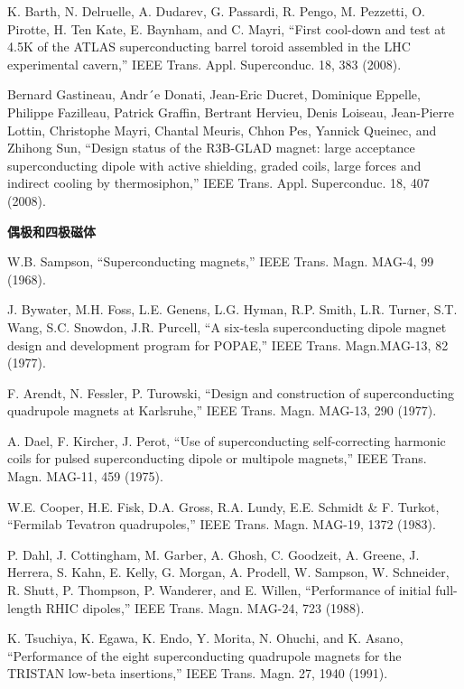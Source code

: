 \noindent [9.300] K. Barth, N. Delruelle, A. Dudarev, G. Passardi, R. Pengo, M. Pezzetti, O. Pirotte,
H. Ten Kate, E. Baynham, and C. Mayri, ``First cool-down and test at 4.5K
of the ATLAS superconducting barrel toroid assembled in the LHC experimental
cavern,” IEEE Trans. Appl. Superconduc. 18, 383 (2008).

\noindent [9.301] Bernard Gastineau, Andr´e Donati, Jean-Eric Ducret, Dominique Eppelle, Philippe
Fazilleau, Patrick Graffin, Bertrant Hervieu, Denis Loiseau, Jean-Pierre Lottin,
Christophe Mayri, Chantal Meuris, Chhon Pes, Yannick Queinec, and Zhihong
Sun, ``Design status of the R3B-GLAD magnet: large acceptance superconducting
dipole with active shielding, graded coils, large forces and indirect cooling
by thermosiphon,” IEEE Trans. Appl. Superconduc. 18, 407 (2008).

\noindent \textbf{偶极和四极磁体}

\noindent [9.302] W.B. Sampson, ``Superconducting magnets,” IEEE Trans. Magn. MAG-4, 99 (1968).

\noindent [9.303] J. Bywater, M.H. Foss, L.E. Genens, L.G. Hyman, R.P. Smith, L.R. Turner,
S.T. Wang, S.C. Snowdon, J.R. Purcell, ``A six-tesla superconducting dipole magnet
design and development program for POPAE,” IEEE Trans. Magn.MAG-13,
82 (1977).

\noindent [9.304] F. Arendt, N. Fessler, P. Turowski, ``Design and construction of superconducting
quadrupole magnets at Karlsruhe,” IEEE Trans. Magn. MAG-13, 290 (1977).

\noindent [9.305] A. Dael, F. Kircher, J. Perot, ``Use of superconducting self-correcting harmonic
coils for pulsed superconducting dipole or multipole magnets,” IEEE Trans. Magn.
MAG-11, 459 (1975).

\noindent [9.306] W.E. Cooper, H.E. Fisk, D.A. Gross, R.A. Lundy, E.E. Schmidt \& F. Turkot,
``Fermilab Tevatron quadrupoles,” IEEE Trans. Magn. MAG-19, 1372 (1983).

\noindent [9.307] P. Dahl, J. Cottingham, M. Garber, A. Ghosh, C. Goodzeit, A. Greene, J. Herrera,
S. Kahn, E. Kelly, G. Morgan, A. Prodell, W. Sampson, W. Schneider, R. Shutt,
P. Thompson, P. Wanderer, and E. Willen, ``Performance of initial full-length
RHIC dipoles,” IEEE Trans. Magn. MAG-24, 723 (1988).

\noindent [9.308] K. Tsuchiya, K. Egawa, K. Endo, Y. Morita, N. Ohuchi, and K. Asano, ``Performance
of the eight superconducting quadrupole magnets for the TRISTAN
low-beta insertions,” IEEE Trans. Magn. 27, 1940 (1991).

